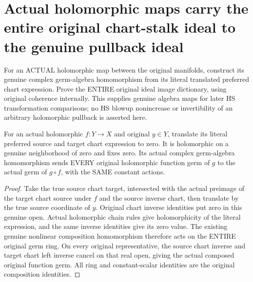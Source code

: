\section{Actual holomorphic maps carry the entire original chart-stalk ideal to the genuine pullback ideal}

For an ACTUAL holomorphic map between the original manifolds, construct its
genuine complex germ-algebra homomorphism from its literal translated preferred
chart expression. Prove the ENTIRE original ideal image dictionary, using
original coherence internally. This supplies genuine algebra maps for later
HS transformation comparisons; no HS blowup nonincrease or invertibility of
an arbitrary holomorphic pullback is asserted here.

\begin{lemma}
\label{hir:actual-original-holomorphic-map-whole-germ-pullback}
\leanok
For an actual holomorphic $f:Y\to X$ and original $y\in Y$, translate its
literal preferred source and target chart expression to zero. It is
holomorphic on a genuine neighborhood of zero and fixes zero. Its actual
complex germ-algebra homomorphism sends EVERY original holomorphic function
germ of $g$ to the actual germ of $g\circ f$, with the SAME constant actions.
\end{lemma}
\begin{proof}
Take the true source chart target, intersected with the actual preimage of
the target chart source under $f$ and the source inverse chart, then translate
by the true source coordinate of $y$. Original chart inverse identities put
zero in this genuine open. Actual holomorphic chain rules give holomorphicity
of the literal expression, and the same inverse identities give its zero
value. The existing genuine nonlinear composition homomorphism therefore
acts on the ENTIRE original germ ring. On every original representative,
the source chart inverse and target chart left inverse cancel on that real
open, giving the actual composed original function germ. All ring and
constant-scalar identities are the original composition identities.
\end{proof}

